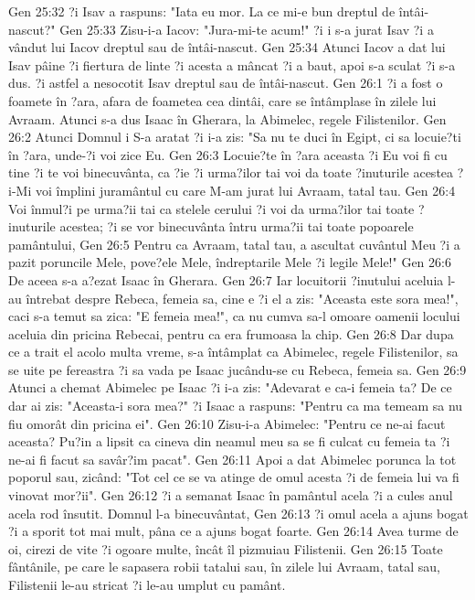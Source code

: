 Gen 25:32  ?i Isav a raspuns: "Iata eu mor. La ce mi-e bun dreptul de întâi-nascut?"
Gen 25:33  Zisu-i-a Iacov: "Jura-mi-te acum!" ?i i s-a jurat Isav ?i a vândut lui Iacov dreptul sau de întâi-nascut.
Gen 25:34  Atunci Iacov a dat lui Isav pâine ?i fiertura de linte ?i acesta a mâncat ?i a baut, apoi s-a sculat ?i s-a dus. ?i astfel a nesocotit Isav dreptul sau de întâi-nascut.
Gen 26:1  ?i a fost o foamete în ?ara, afara de foametea cea dintâi, care se întâmplase în zilele lui Avraam. Atunci s-a dus Isaac în Gherara, la Abimelec, regele Filistenilor.
Gen 26:2  Atunci Domnul i S-a aratat ?i i-a zis: "Sa nu te duci în Egipt, ci sa locuie?ti în ?ara, unde-?i voi zice Eu.
Gen 26:3  Locuie?te în ?ara aceasta ?i Eu voi fi cu tine ?i te voi binecuvânta, ca ?ie ?i urma?ilor tai voi da toate ?inuturile acestea ?i-Mi voi împlini juramântul cu care M-am jurat lui Avraam, tatal tau.
Gen 26:4  Voi înmul?i pe urma?ii tai ca stelele cerului ?i voi da urma?ilor tai toate ?inuturile acestea; ?i se vor binecuvânta întru urma?ii tai toate popoarele pamântului,
Gen 26:5  Pentru ca Avraam, tatal tau, a ascultat cuvântul Meu ?i a pazit poruncile Mele, pove?ele Mele, îndreptarile Mele ?i legile Mele!"
Gen 26:6  De aceea s-a a?ezat Isaac în Gherara.
Gen 26:7  Iar locuitorii ?inutului aceluia l-au întrebat despre Rebeca, femeia sa, cine e ?i el a zis: "Aceasta este sora mea!", caci s-a temut sa zica: "E femeia mea!", ca nu cumva sa-l omoare oamenii locului aceluia din pricina Rebecai, pentru ca era frumoasa la chip.
Gen 26:8  Dar dupa ce a trait el acolo multa vreme, s-a întâmplat ca Abimelec, regele Filistenilor, sa se uite pe fereastra ?i sa vada pe Isaac jucându-se cu Rebeca, femeia sa.
Gen 26:9  Atunci a chemat Abimelec pe Isaac ?i i-a zis: "Adevarat e ca-i femeia ta? De ce dar ai zis: "Aceasta-i sora mea?" ?i Isaac a raspuns: "Pentru ca ma temeam sa nu fiu omorât din pricina ei".
Gen 26:10  Zisu-i-a Abimelec: "Pentru ce ne-ai facut aceasta? Pu?in a lipsit ca cineva din neamul meu sa se fi culcat cu femeia ta ?i ne-ai fi facut sa savâr?im pacat".
Gen 26:11  Apoi a dat Abimelec porunca la tot poporul sau, zicând: "Tot cel ce se va atinge de omul acesta ?i de femeia lui va fi vinovat mor?ii".
Gen 26:12  ?i a semanat Isaac în pamântul acela ?i a cules anul acela rod însutit. Domnul l-a binecuvântat,
Gen 26:13  ?i omul acela a ajuns bogat ?i a sporit tot mai mult, pâna ce a ajuns bogat foarte.
Gen 26:14  Avea turme de oi, cirezi de vite ?i ogoare multe, încât îl pizmuiau Filistenii.
Gen 26:15  Toate fântânile, pe care le sapasera robii tatalui sau, în zilele lui Avraam, tatal sau, Filistenii le-au stricat ?i le-au umplut cu pamânt.
